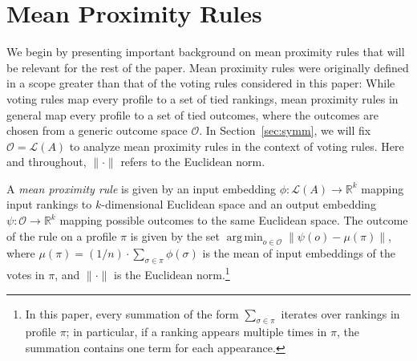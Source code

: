 \documentclass[prodmode]{acmsmall-ec14}
\newcommand{\calL}{{\mathcal{L}}}
\newcommand{\rank}{{\calL(A)}}
\newcommand{\calO}{{\mathcal{O}}}
\DeclareMathOperator*{\argmin}{arg\,min}
\newcommand{\kibitz}[2]{\ifnum\Comments=1\textcolor{#1}{#2}\fi}
\newcommand{\ns}[1]{\kibitz{red} {[NS: #1]}}
\begin{document}



\section{Mean Proximity Rules}
\label{sec:mpr}

We begin by  presenting important background on mean proximity rules that will be relevant for the rest of the paper. Mean proximity rules were originally defined in a scope greater than that of the voting rules considered in this paper: While voting rules map every profile to a set of tied rankings, mean proximity rules in general map every profile to a set of tied outcomes, where the outcomes are chosen from a generic outcome space $\calO$. In Section~\ref{sec:symm}, we will fix $\calO = \rank$ to analyze mean proximity rules in the context of voting rules. Here and throughout, $\|\cdot\| $ refers to the Euclidean norm.

\begin{definition}
A \emph{mean proximity rule} is given by an input embedding $\phi: \rank \rightarrow \mathbb{R}^k$ mapping input rankings to $k$-dimensional Euclidean space and an output embedding $\psi: \calO \rightarrow \mathbb{R}^k$ mapping possible outcomes to the same Euclidean space. The outcome of the rule on a profile $\pi$ is given by the set $\argmin_{o \in \calO} \|\psi(o) - \mu(\pi) \|$, where $\mu(\pi) = (1/n) \cdot \sum_{\sigma \in \pi} \phi(\sigma)$ is the mean of input embeddings of the votes in $\pi$, and $\|\cdot\|$ is the Euclidean norm.\footnote{In this paper, every summation of the form $\sum_{\sigma \in \pi}$  iterates over rankings in profile $\pi$; in particular, if a ranking appears multiple times in $\pi$, the summation contains one term for each appearance.}
\end{definition}
\end{document}

